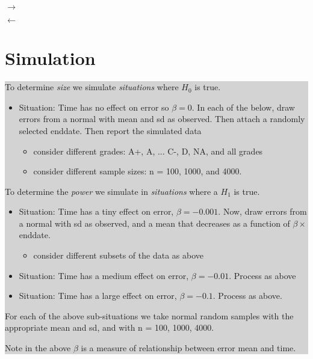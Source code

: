 \documentclass[10pt, oneside]{article}
\newcommand \diabox[2]{\colorbox{lightgray}{\parbox{#1}{#2}}}
\begin{document}
\hfill
\begin{minipage}[t]{1cm}

\vskip 2in

\Huge$\rightarrow$

\vskip 2in

$\leftarrow$\normalsize

\end{minipage}
\hfill
\begin{minipage}[t]{8cm}

\section*{Simulation}
\diabox{8cm}{
To determine \emph{size} we simulate \emph{situations} where $H_0$ is true. 

\begin{itemize}
\item Situation: Time has no effect on error so $\beta = 0$. In each of the below, draw errors from a normal with mean and sd as observed. Then attach a randomly selected enddate. Then report the simulated data

\begin{itemize}
\item consider different grades: A+, A, ... C-, D, NA, and all grades

\item consider different sample sizes: n = 100, 1000, and 4000. 
\end{itemize}

\end{itemize}

To determine the \emph{power} we simulate in \emph{situations} where a $H_1$ is true. 

\begin{itemize}
\item Situation: Time has a tiny effect on error, $\beta = -0.001$. Now, draw errors from a normal with sd as observed, and a mean that decreases as a function of $\beta \times$enddate. 

\begin{itemize}
\item consider different subsets of the data as above
\end{itemize}

\item Situation: Time has a medium effect on error, $\beta = -0.01$. Process as above

\item Situation: Time has a large effect on error, $\beta = -0.1$. Process as above. 

\end{itemize}

For each of the above sub-situations we take normal random samples with the appropriate mean and sd, and with n = 100, 1000, 4000. 

Note in the above $\beta$ is a measure of relationship between error mean and time.

}
\end{minipage}
\end{document}
